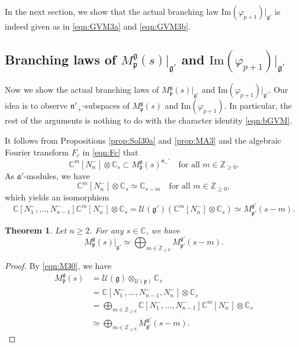 \documentclass[reqno,11pt]{amsart}
\newtheorem{thm}[equation]{Theorem}
\theoremstyle{remark}
\theoremstyle{definition}
\numberwithin{equation}{section}
\newcommand{\fa}{{\mathfrak a}}
\newcommand{\fg}{{\mathfrak g}}
\newcommand{\fn}{{\mathfrak n}}
\newcommand{\fp}{{\mathfrak p}}
\newcommand{\C}{\mathbb{C}}
\newcommand{\Z}{\mathbb{Z}}
\newcommand{\Cal}{\mathcal}
\renewcommand{\Im}{\mathrm{Im}}
\newcommand{\Mp}{M^{\fg}_{\fp}}
\newcommand{\Mpp}{M^{\fg'}_{\fp'}}
\begin{document}
In the next section, we show that
the actual branching law $\Im(\varphi_{p+1})\vert_{\fg'}$
is indeed given as in 
\eqref{eqn:GVM3a} and \eqref{eqn:GVM3b}.

\subsection{Branching laws of $\Mp(s)\vert_{\fg'}$ and 
$\Im(\varphi_{p+1})\vert_{\fg'}$}
\label{sec:GVMc}

Now we show the actual branching laws of 
$\Mp(s)\vert_{\fg'}$ and $\Im(\varphi_{p+1})\vert_{\fg'}$.
Our idea is to observe $\fn'_+$-subspaces of 
$\Mp(s)$ and $\Im(\varphi_{p+1})$.
In particular, the rest of the arguments is nothing to do with the character 
identity \eqref{eqn:bGVM}.

It follows from 
Propositions \ref{prop:Sol30a} and \ref{prop:MA3}
and the algebraic Fourier transform $F_c$ in \eqref{eqn:Fc} that
\begin{equation}\label{eqn:M300}
\C^m[N_n^-] \otimes \C_s \subset \Mp(s)^{\fn_+'} 
\quad
\text{for all $m \in \Z_{\geq 0}$}.
\end{equation}
As $\fa'$-modules, we have 
\begin{equation}\label{eqn:M30a}
\C^m[N_n^-] \otimes \C_s\simeq \C_{s-m}
\quad
\text{for all $m \in \Z_{\geq 0}$},
\end{equation}
which yields an isomorphism
\begin{equation}\label{eqn:M30}
\C[N_1^-,\ldots, N_{n-1}^-]\C^m[N_n^-] \otimes \C_s 
=
\Cal{U}(\fg')(\C^m[N_n^-] \otimes \C_s)
\simeq
\Mpp(s-m).
\end{equation}

\begin{thm}\label{thm:GVM31a}
Let $n\geq 2$. For any $s \in \C$,  we have
\begin{equation}\label{eqn:GVM31c}
\Mp(s)\vert_{\fg'} \simeq 
\bigoplus_{m \in \Z_{\geq 0}}\Mpp(s-m).
\end{equation}
\end{thm}

\begin{proof}
By \eqref{eqn:M30}, we have 
\begin{align*}
\Mp(s) 
&=\Cal{U}(\fg)\otimes_{\Cal{U}(\fp)}\C_s\\
&=\C[N_1^-,\ldots, N_{n-1}^-, N_n^-]\otimes \C_s\\
&=\bigoplus_{m\in\Z_{\geq 0}} 
\C[N_1^-,\ldots, N_{n-1}^-]\C^m[N_n^-] \otimes \C_s\\
&\simeq
\bigoplus_{m\in\Z_{\geq 0}} 
\Mpp(s-m).
\end{align*}
\end{proof}
\end{document}
